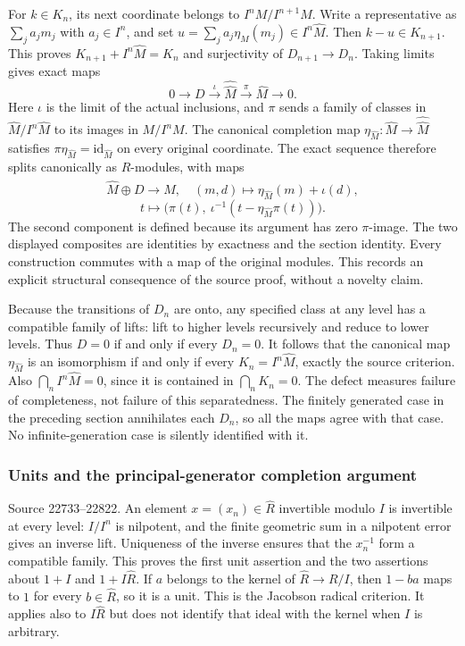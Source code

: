 For \(k\in K_n\), its next coordinate belongs to \(I^nM/I^{n+1}M\). Write a representative as \(\sum_j a_jm_j\) with \(a_j\in I^n\), and set \(u=\sum_j a_j\eta_M(m_j)\in I^n\widehat M\). Then \(k-u\in K_{n+1}\). This proves \(K_{n+1}+I^n\widehat M=K_n\) and surjectivity of \(D_{n+1}\to D_n\). Taking limits gives exact maps \[
0\longrightarrow D\xrightarrow{\iota}
  \widehat{\widehat M}\xrightarrow{\pi}\widehat M
  \longrightarrow0.
\] Here \(\iota\) is the limit of the actual inclusions, and \(\pi\) sends a family of classes in \(\widehat M/I^n\widehat M\) to its images in \(M/I^nM\). The canonical completion map \(\eta_{\widehat M}:\widehat M\to\widehat{\widehat M}\) satisfies \(\pi\eta_{\widehat M}=\mathrm{id}_{\widehat M}\) on every original coordinate. The exact sequence therefore splits canonically as \(R\)-modules, with maps \[
\widehat M\oplus D\longrightarrow\widehat{\widehat M},
\quad (m,d)\longmapsto\eta_{\widehat M}(m)+\iota(d),
\] \[
t\longmapsto
 \bigl(\pi(t),\ \iota^{-1}(t-\eta_{\widehat M}\pi(t))\bigr).
\] The second component is defined because its argument has zero \(\pi\)-image. The two displayed composites are identities by exactness and the section identity. Every construction commutes with a map of the original modules. This records an explicit structural consequence of the source proof, without a novelty claim.

Because the transitions of \(D_n\) are onto, any specified class at any level has a compatible family of lifts: lift to higher levels recursively and reduce to lower levels. Thus \(D=0\) if and only if every \(D_n=0\). It follows that the canonical map \(\eta_{\widehat M}\) is an isomorphism if and only if every \(K_n=I^n\widehat M\), exactly the source criterion. Also \(\bigcap_n I^n\widehat M=0\), since it is contained in \(\bigcap_nK_n=0\). The defect measures failure of completeness, not failure of this separatedness. The finitely generated case in the preceding section annihilates each \(D_n\), so all the maps agree with that case. No infinite-generation case is silently identified with it.

\subsubsection{Units and the principal-generator completion argument}\label{algebra-proof-014-units-and-the-principal-generator-completion-argument}

Source 22733--22822. An element \(x=(x_n)\in\widehat R\) invertible modulo \(I\) is invertible at every level: \(I/I^n\) is nilpotent, and the finite geometric sum in a nilpotent error gives an inverse lift. Uniqueness of the inverse ensures that the \(x_n^{-1}\) form a compatible family. This proves the first unit assertion and the two assertions about \(1+I\) and \(1+I\widehat R\). If \(a\) belongs to the kernel of \(\widehat R\to R/I\), then \(1-ba\) maps to \(1\) for every \(b\in\widehat R\), so it is a unit. This is the Jacobson radical criterion. It applies also to \(I\widehat R\) but does not identify that ideal with the kernel when \(I\) is arbitrary.

